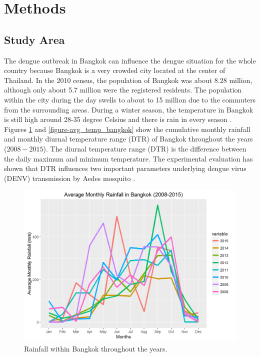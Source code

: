 \documentclass{bmcart}
\begin{document}
%




\section{Methods}



\subsection{Study Area}


The dengue outbreak in Bangkok can influence the dengue situation for the whole country because Bangkok is a very crowded city located at the center of Thailand. In the 2010 census, the population of Bangkok was about 8.28 million, although only about 5.7 million were the registered residents. The population within the city during the day swells to about to 15 million \cite{WPR2015} due to the commuters from the surrounding areas. During a winter season, the temperature in Bangkok is still high around 28-35 degree Celsius and there is rain in every season \cite{wwo2012}. Figures \ref{figure-avg_rain_bangkok} and \ref{figure-avg_temp_bangkok} show the cumulative monthly rainfall and monthly diurnal temperature range (DTR) of Bangkok throughout the years ($2008-2015$).  The diurnal temperature range (DTR) is the difference between the daily maximum and minimum temperature. The experimental evaluation has shown that DTR influences two important parameters underlying dengue virus (DENV) transmission by Aedes mosquito \cite{lambrechts2011impact}. 


\begin{figure}[htbp]
	\begin{center}
		\includegraphics[width= 1.0\textwidth]{1-AvgMonthlyRainfall}
		\caption{Rainfall within Bangkok throughout the years.}
		\label{figure-avg_rain_bangkok}
	\end{center}
\end{figure}
\end{document}
